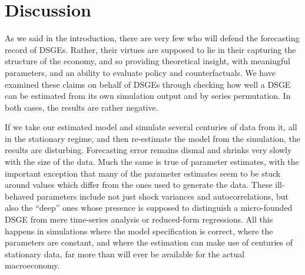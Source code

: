 \documentclass[11pt]{article}
\begin{document}
\clearpage

\hypertarget{discussion}{%
\section{Discussion}\label{discussion}}

As we said in the introduction, there are very few who will defend the
forecasting record of DSGEs. Rather, their virtues are supposed to lie
in their capturing the structure of the economy, and so providing
theoretical insight, with meaningful parameters, and an ability to
evaluate policy and counterfactuals. We have examined these claims on
behalf of DSGEs through checking how well a DSGE can be estimated from
its own simulation output and by series permutation. In both cases, the
results are rather negative.

If we take our estimated model and simulate several centuries of data
from it, all in the stationary regime, and then re-estimate the model
from the simulation, the results are disturbing. Forecasting error
remains dismal and shrinks very slowly with the size of the data. Much
the same is true of parameter estimates, with the important exception
that many of the parameter estimates seem to be stuck around values
which differ from the ones used to generate the data. These ill-behaved
parameters include not just shock variances and autocorrelations, but
also the ``deep'' ones whose presence is supposed to distinguish a
micro-founded DSGE from mere time-series analysis or reduced-form
regressions. All this happens in simulations where the model
specification is correct, where the parameters are constant, and where
the estimation can make use of centuries of stationary data, far more
than will ever be available for the actual macroeconomy.
\end{document}
